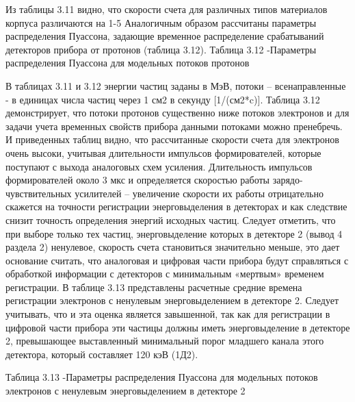 Из таблицы 3.11 видно, что скорости счета для различных типов материалов корпуса различаются на 1-5%
Аналогичным образом рассчитаны параметры распределения Пуассона, задающие временное распределение срабатываний детекторов прибора от протонов (таблица 3.12).
Таблица 3.12 -Параметры распределения Пуассона для модельных потоков протонов


В таблицах 3.11 и 3.12 энергии частиц заданы в МэВ, потоки – всенаправленные - в единицах числа частиц через 1 см2  в секунду  [1/(см2*c)].  Таблица 3.12 демонстрирует, что потоки протонов существенно ниже потоков электронов и для задачи учета временных свойств прибора данными потоками можно пренебречь.
И приведенных таблиц видно, что рассчитанные скорости счета для электронов очень высоки, учитывая длительности импульсов формирователей, которые поступают с выхода аналоговых схем усиления. Длительность импульсов формирователей около 3 мкс и определяется скоростью работы зарядо-чувствительных усилителей – увеличение скорости их работы отрицательно скажется на точности регистрации энерговыделения в детекторах и как следствие снизит точность определения энергий исходных частиц.
Следует отметить, что при выборе только тех частиц, энерговыделение которых в детекторе 2 (вывод 4 раздела 2) ненулевое, скорость счета становиться значительно меньше, это дает основание считать, что аналоговая и цифровая части прибора будут справляться с обработкой информации с детекторов с минимальным «мертвым» временем регистрации. В таблице 3.13 представлены расчетные средние времена регистрации электронов с ненулевым энерговыделением в детекторе 2. Следует учитывать, что и эта оценка является завышенной, так как для регистрации в цифровой части прибора эти частицы должны иметь энерговыделение в детекторе 2, превышающее выставленный минимальный порог младшего канала этого детектора, который составляет 120 кэВ (1Д2).


Таблица 3.13 -Параметры распределения Пуассона для модельных потоков электронов с ненулевым энерговыделением в детекторе 2

